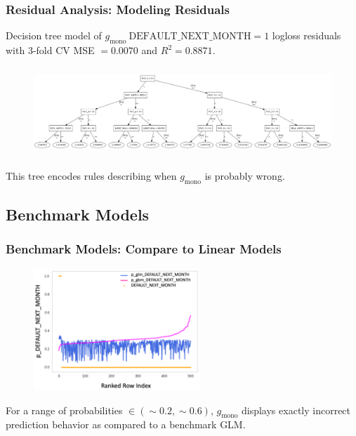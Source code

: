 \documentclass[11pt,
               aspectratio=169,
               hyperref={colorlinks}
               ]{beamer}
\begin{document}
			\begin{frame}[t]
		
				\frametitle{\textbf{Residual Analysis}: Modeling Residuals}
				Decision tree model of $g_{\text{mono}} ~\text{DEFAULT\_NEXT\_MONTH} =1$ logloss residuals with 3-fold CV MSE $=0.0070$ and $R^2=0.8871$.
				\begin{figure}
					\begin{center}
						\includegraphics[height=95pt, width=330pt]{img/surrogate_dt_1.png}
					\end{center}
				\end{figure}	
				This tree encodes rules describing when $g_{\text{mono}}$ is probably wrong.
			\end{frame}
			
		\subsection{Benchmark Models}

			\begin{frame}
		
				\frametitle{\textbf{Benchmark Models}: Compare to Linear Models}
				\begin{figure}
					\begin{center}
						\includegraphics[height=130pt]{img/benchmark.png}
					\end{center}
				\end{figure}	
				\vspace{-10pt}
				For a range of probabilities $\in  (\sim0.2, \sim0.6)$, $g_{\text{mono}}$ displays exactly incorrect prediction behavior as compared to a benchmark GLM.
			\end{frame}
\end{document}
